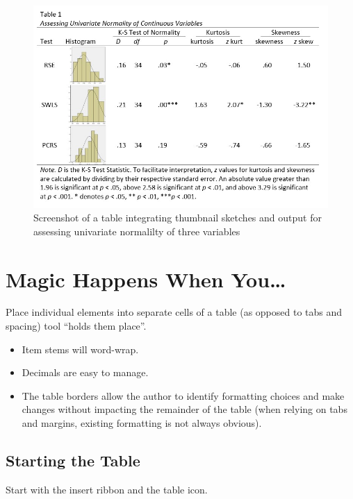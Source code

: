 \documentclass[
  english,
]{book}
\providecommand{\tightlist}{%
  \setlength{\itemsep}{0pt}\setlength{\parskip}{0pt}}
\begin{document}
\begin{figure}
\centering
\includegraphics{images/TableMagic/TAble1.jpg}
\caption{Screenshot of a table integrating thumbnail sketches and output for assessing univariate normalilty of three variables}
\end{figure}

\hypertarget{magic-happens-when-you}{%
\section{Magic Happens When You\ldots{}}\label{magic-happens-when-you}}

Place individual elements into separate cells of a table (as opposed to tabs and spacing) tool ``holds them place''.

\begin{itemize}
\tightlist
\item
  Item stems will word-wrap.
\item
  Decimals are easy to manage.
\item
  The table borders allow the author to identify formatting choices and make changes without impacting the remainder of the table (when relying on tabs and margins, existing formatting is not always obvious).
\end{itemize}

\hypertarget{starting-the-table}{%
\subsection{Starting the Table}\label{starting-the-table}}

Start with the insert ribbon and the table icon.
\end{document}

